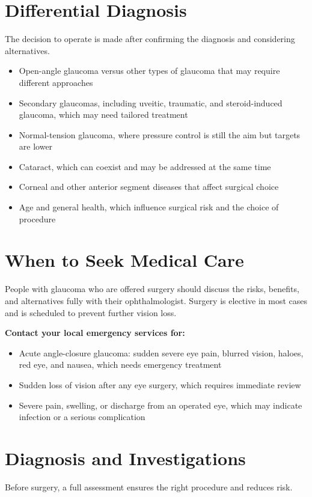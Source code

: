 \section*{Differential Diagnosis}
The decision to operate is made after confirming the diagnosis and considering alternatives.

\begin{itemize}
    \item Open-angle glaucoma versus other types of glaucoma that may require different approaches
    \item Secondary glaucomas, including uveitic, traumatic, and steroid-induced glaucoma, which may need tailored treatment
    \item Normal-tension glaucoma, where pressure control is still the aim but targets are lower
    \item Cataract, which can coexist and may be addressed at the same time
    \item Corneal and other anterior segment diseases that affect surgical choice
    \item Age and general health, which influence surgical risk and the choice of procedure
\end{itemize}

\section*{When to Seek Medical Care}
People with glaucoma who are offered surgery should discuss the risks, benefits, and alternatives fully with their ophthalmologist. Surgery is elective in most cases and is scheduled to prevent further vision loss.

\textbf{Contact your local emergency services for:}
\begin{itemize}
    \item Acute angle-closure glaucoma: sudden severe eye pain, blurred vision, haloes, red eye, and nausea, which needs emergency treatment
    \item Sudden loss of vision after any eye surgery, which requires immediate review
    \item Severe pain, swelling, or discharge from an operated eye, which may indicate infection or a serious complication
\end{itemize}

\section*{Diagnosis and Investigations}
Before surgery, a full assessment ensures the right procedure and reduces risk.

